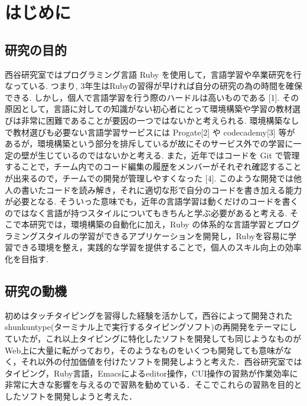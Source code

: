 \chapter{はじめに}\label{ux306fux3058ux3081ux306b}

    \section{研究の目的}\label{ux7814ux7a76ux306eux76eeux7684}

    西谷研究室ではプログラミング言語 Ruby を使用して，言語学習や卒業研究を行なっている. つまり, 3年生はRubyの習得が早ければ自分の研究の為の時間を確保できる. しかし，個人で言語学習を行う際のハードルは高いものである [1]. その原因として，言語に対しての知識がない初心者にとって環境構築や学習の教材選びは非常に困難であることが要因の一つではないかと考えられる. 環境構築なしで教材選びも必要ない言語学習サービスには Progate[2] や codecademy[3] 等があるが，環境構築という部分を排斥しているが故にそのサービス外での学習に一定の壁が生じているのではないかと考える.
また，近年ではコードを Git で管理することで，チーム内でのコード編集の履歴をメンバーがそれぞれ確認することが出来るので，チームでの開発が管理しやすくなった [4]. このような開発では他人の書いたコードを読み解き，それに適切な形で自分のコードを書き加える能力が必要となる. そういった意味でも，近年の言語学習は動くだけのコードを書くのではなく言語が持つスタイルについてもきちんと学ぶ必要があると考える.
そこで本研究では，環境構築の自動化に加え，Ruby の体系的な言語学習とプログラミングスタイルの学習ができるアプリケーションを開発し，Rubyを容易に学習できる環境を整え，実践的な学習を提供することで，個人のスキル向上の効率化を目指す.


    \section{研究の動機}\label{ux7814ux7a76ux306eux52d5ux6a5f}

    初めはタッチタイピングを習得した経験を活かして，西谷によって開発されたshunkuntype(ターミナル上で実行するタイピングソフト)の再開発をテーマにしていたが，これ以上タイピングに特化したソフトを開発しても同じようなものがWeb上に大量に転がっており，そのようなものをいくつも開発しても意味がなく，それ以外の付加価値を付けたソフトを開発しようと考えた．西谷研究室ではタイピング，Ruby言語，Emacsによるeditor操作，CUI操作の習熟が作業効率に非常に大きな影響を与えるので習熟を勧めている．そこでこれらの習熟を目的としたソフトを開発しようと考えた．

    
